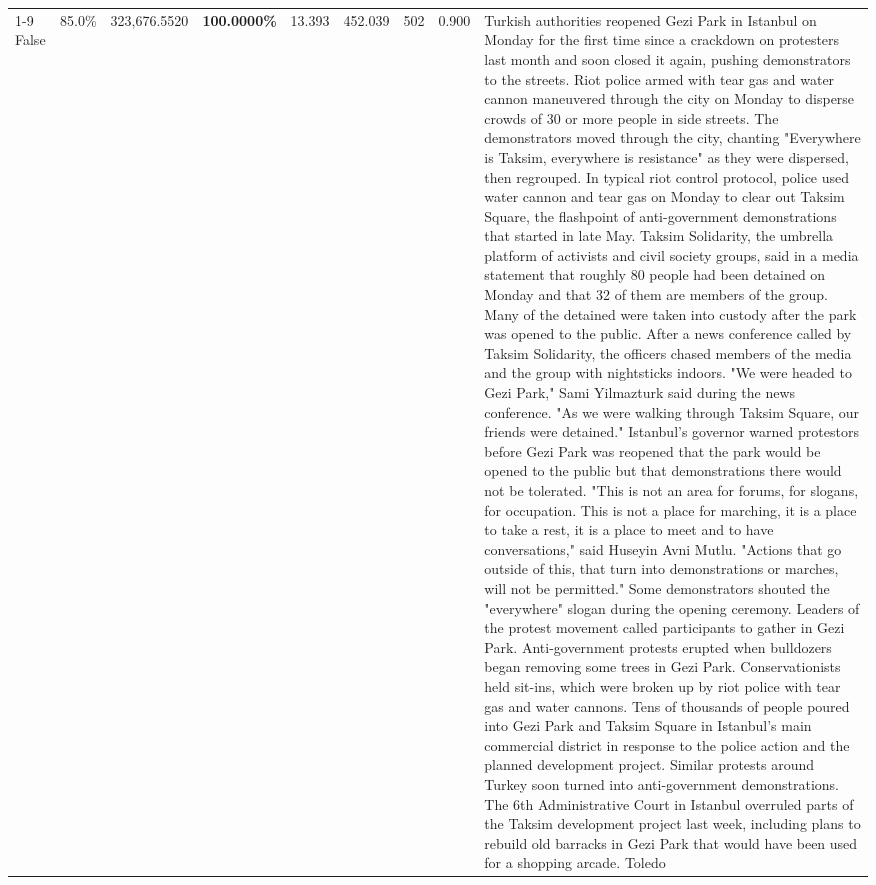 \begin{table}[H]
\begin{tabular}{lllrlllll}
\cline{1-9}
False & 85.0\% & 323,676.5520 & \bfseries \color{red} 100.0000\% & 13.393 & 452.039 & 502 & 0.900 & Turkish authorities reopened Gezi Park in Istanbul on Monday for the first time since a crackdown on protesters last month and soon closed it again, pushing demonstrators to the streets. Riot police armed with tear gas and water cannon maneuvered through the city on Monday to disperse crowds of 30 or more people in side streets. The demonstrators moved through the city, chanting "Everywhere is Taksim, everywhere is resistance" as they were dispersed, then regrouped. In typical riot control protocol, police used water cannon and tear gas on Monday to clear out Taksim Square, the flashpoint of anti-government demonstrations that started in late May. Taksim Solidarity, the umbrella platform of activists and civil society groups, said in a media statement that roughly 80 people had been detained on Monday and that 32 of them are members of the group. Many of the detained were taken into custody after the park was opened to the public. After a news conference called by Taksim Solidarity, the officers chased members of the media and the group with nightsticks indoors. "We were headed to Gezi Park," Sami Yilmazturk said during the news conference. "As we were walking through Taksim Square, our friends were detained." Istanbul's governor warned protestors before Gezi Park was reopened that the park would be opened to the public but that demonstrations there would not be tolerated. "This is not an area for forums, for slogans, for occupation. This is not a place for marching, it is a place to take a rest, it is a place to meet and to have conversations," said Huseyin Avni Mutlu. "Actions that go outside of this, that turn into demonstrations or marches, will not be permitted." Some demonstrators shouted the "everywhere" slogan during the opening ceremony. Leaders of the protest movement called participants to gather in Gezi Park. Anti-government protests erupted when bulldozers began removing some trees in Gezi Park. Conservationists held sit-ins, which were broken up by riot police with tear gas and water cannons. Tens of thousands of people poured into Gezi Park and Taksim Square in Istanbul's main commercial district in response to the police action and the planned development project. Similar protests around Turkey soon turned into anti-government demonstrations. The 6th Administrative Court in Istanbul overruled parts of the Taksim development project last week, including plans to rebuild old barracks in Gezi Park that would have been used for a shopping arcade. Toledo \\

\end{tabular}
\end{table}
